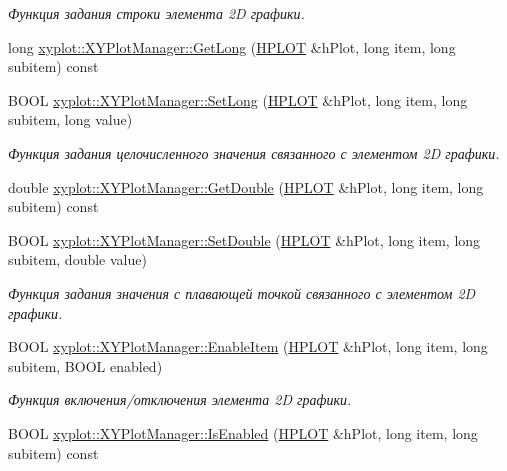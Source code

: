 \begin{DoxyCompactItemize}
\begin{DoxyCompactList}\small\item\em Функция задания строки элемента 2\-D графики. \end{DoxyCompactList}\item 
long \hyperlink{group__gr_elements_ga02ac169b6968c5e778fdb120cfa2cbb5}{xyplot\-::\-X\-Y\-Plot\-Manager\-::\-Get\-Long} (\hyperlink{classxyplot_1_1_h_p_l_o_t}{H\-P\-L\-O\-T} \&h\-Plot, long item, long subitem) const 
\item 
B\-O\-O\-L \hyperlink{group__gr_elements_gaa92b59ee49654f44a139658e0e2e4af4}{xyplot\-::\-X\-Y\-Plot\-Manager\-::\-Set\-Long} (\hyperlink{classxyplot_1_1_h_p_l_o_t}{H\-P\-L\-O\-T} \&h\-Plot, long item, long subitem, long value)
\begin{DoxyCompactList}\small\item\em Функция задания целочисленного значения связанного с элементом 2\-D графики. \end{DoxyCompactList}\item 
double \hyperlink{group__gr_elements_gabc94c084a9d1e27c112606bac9ed6505}{xyplot\-::\-X\-Y\-Plot\-Manager\-::\-Get\-Double} (\hyperlink{classxyplot_1_1_h_p_l_o_t}{H\-P\-L\-O\-T} \&h\-Plot, long item, long subitem) const 
\item 
B\-O\-O\-L \hyperlink{group__gr_elements_gada6cc7904e60ca04d109118293b01265}{xyplot\-::\-X\-Y\-Plot\-Manager\-::\-Set\-Double} (\hyperlink{classxyplot_1_1_h_p_l_o_t}{H\-P\-L\-O\-T} \&h\-Plot, long item, long subitem, double value)
\begin{DoxyCompactList}\small\item\em Функция задания значения с плавающей точкой связанного с элементом 2\-D графики. \end{DoxyCompactList}\item 
B\-O\-O\-L \hyperlink{group__gr_elements_ga760b95b60afd9044a598128f49d475e8}{xyplot\-::\-X\-Y\-Plot\-Manager\-::\-Enable\-Item} (\hyperlink{classxyplot_1_1_h_p_l_o_t}{H\-P\-L\-O\-T} \&h\-Plot, long item, long subitem, B\-O\-O\-L enabled)
\begin{DoxyCompactList}\small\item\em Функция включения/отключения элемента 2\-D графики. \end{DoxyCompactList}\item 
B\-O\-O\-L \hyperlink{group__gr_elements_ga46fa280afeab028fa4e2e71d574648da}{xyplot\-::\-X\-Y\-Plot\-Manager\-::\-Is\-Enabled} (\hyperlink{classxyplot_1_1_h_p_l_o_t}{H\-P\-L\-O\-T} \&h\-Plot, long item, long subitem) const 

\end{DoxyCompactItemize}
